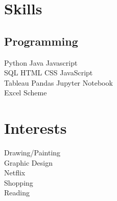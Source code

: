 \documentclass[]{deedy-resume-openfont}
\begin{document}
\begin{minipage}[t]{0.33\textwidth}

\section{Skills}
\subsection{Programming}
Python \textbullet{} Java \textbullet{} Javascript \\
SQL \textbullet{} HTML \textbullet{} CSS \textbullet{} JavaScript \\ 
Tableau \textbullet{} Pandas \textbullet{} Jupyter Notebook \\
Excel \textbullet{} Scheme \\
\sectionsep


\section{Interests}
Drawing/Painting \\
Graphic Design \\
Netflix \\
Shopping \\
Reading \\
\sectionsep

%
%

\end{minipage} 
\hfill
\end{document}
